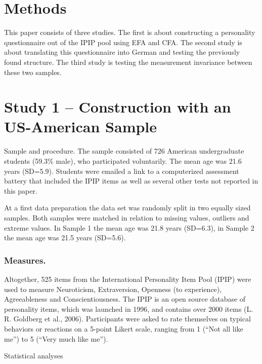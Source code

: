 \documentclass[man]{apa6}
\theoremstyle{definition}
\theoremstyle{definition}
\theoremstyle{definition}
\theoremstyle{remark}
\begin{document}
\hypertarget{methods}{%
\section{Methods}\label{methods}}

This paper consists of three studies. The first is about constructing a
personality questionnaire out of the IPIP pool using EFA and CFA. The
second study is about translating this questionnaire into German and
testing the previously found structure. The third study is testing the
measurement invariance between these two samples.

\hypertarget{study-1-construction-with-an-us-american-sample}{%
\section{Study 1 -- Construction with an US-American
Sample}\label{study-1-construction-with-an-us-american-sample}}

Sample and procedure. The sample consisted of 726 American undergraduate
students (59.3\% male), who participated voluntarily. The mean age was
21.6 years (SD=5.9). Students were emailed a link to a computerized
assessment battery that included the IPIP items as well as several other
tests not reported in this paper.

At a first data preparation the data set was randomly split in two
equally sized samples. Both samples were matched in relation to missing
values, outliers and extreme values. In Sample 1 the mean age was 21.8
years (SD=6.3), in Sample 2 the mean age was 21.5 years (SD=5.6).

\hypertarget{measures.}{%
\subsubsection{Measures.}\label{measures.}}

Altogether, 525 items from the International Personality Item Pool
(IPIP) were used to measure Neuroticism, Extraversion, Openness (to
experience), Agreeableness and Conscientiousness. The IPIP is an open
source database of personality items, which was launched in 1996, and
contains over 2000 items (L. R. Goldberg et al., 2006). Participants
were asked to rate themselves on typical behaviors or reactions on a
5-point Likert scale, ranging from 1 (\enquote{Not all like me}) to 5
(\enquote{Very much like me}).

Statistical analyses
\end{document}
